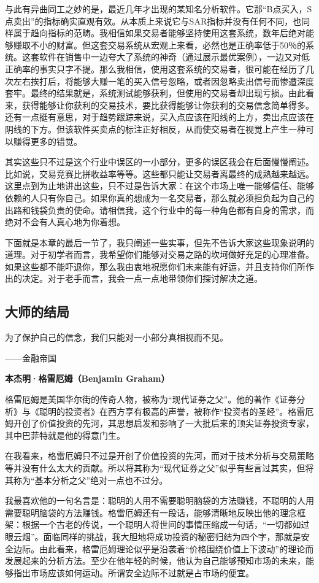 与此有异曲同工之妙的是，最近几年才出现的某知名分析软件。它那“B点买入，S点卖出”的指标确实直观有效。从本质上来说它与SAR指标并没有任何不同，也同样属于趋向指标的范畴。我相信如果交易者能够坚持使用这套系统，数年后绝对能够赚取不小的财富。但这套交易系统从宏观上来看，必然也是正确率低于50％的系统。这套软件在销售中一边夸大了系统的神奇（通过展示最优案例），一边又对低正确率的事实只字不提。那么我相信，使用这套系统的交易者，很可能在经历了几次左右挨打后，将能够大赚一笔的买入信号忽略，或者因忽略卖出信号而惨遭深度套牢。最终的结果就是，系统测试能够获利，但使用的交易者却出现亏损。由此看来，获得能够让你获利的交易技术，要比获得能够让你获利的交易信念简单得多。还有一点挺有意思，对于趋势跟踪来说，买入点应该在阳线的上方，卖出点应该在阴线的下方。但该软件买卖点的标注正好相反，从而使交易者在视觉上产生一种可以赚得更多的错觉。

其实这些只不过是这个行业中误区的一小部分，更多的误区我会在后面慢慢阐述。比如说，交易竞赛比拼收益率等等。这些都只能让交易者离最终的成熟越来越远。这里点到为止地讲出这些，只不过是告诉大家：在这个市场上唯一能够信任、能够依赖的人只有你自己。如果你真的想成为一名交易者，那么就必须担负起为自己的出路和钱袋负责的使命。请相信我，这个行业中的每一种角色都有自身的需求，而绝对不会有人真心地为你着想。

下面就是本章的最后一节了，我只阐述一些实事，但先不告诉大家这些现象说明的道理。对于初学者而言，我希望你们能够对交易之路的坎坷做好充足的心理准备。如果这些都不能吓退你，那么我由衷地祝愿你们未来能有好运，并且支持你们所作出的决定。对于老手而言，我会一点一点地带领你们探讨解决之道。

\subsection{大师的结局}

{\kaishu
为了保护自己的信念，我们只能对一小部分真相视而不见。

\hfill ——金融帝国
}

\textbf{本杰明·格雷厄姆（Benjamin Graham）}

格雷厄姆是美国华尔街的传奇人物，被称为“现代证券之父”。他的著作《证券分析》与《聪明的投资者》在西方享有极高的声誉，被称作“投资者的圣经”。格雷厄姆开创了价值投资的先河，其思想启发和影响了一大批后来的顶尖证券投资专家，其中巴菲特就是他的得意门生。

在我看来，格雷厄姆只不过是开创了价值投资的先河，而对于技术分析与交易策略等并没有什么太大的贡献。所以将其称为“现代证券之父”似乎有些言过其实，但将其称为“基本分析之父”绝对一点也不过分。

我最喜欢他的一句名言是：聪明的人用不需要聪明脑袋的方法赚钱，不聪明的人用需要聪明脑袋的方法赚钱。格雷厄姆还有一段话，能够清晰地反映出他的理念框架：根据一个古老的传说，一个聪明人将世间的事情压缩成一句话，“一切都如过眼云烟”。面临同样的挑战，我大胆地将成功投资的秘密归结为四个字，那就是安全边际。由此看来，格雷厄姆理论似乎是沿袭着“价格围绕价值上下波动”的理论而发展起来的分析方法。至少在他年轻的时候，他认为自己能够预知市场的未来，能够指出市场应该如何运动。所谓安全边际不过就是占市场的便宜。

